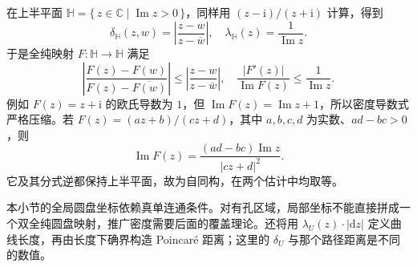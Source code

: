 \ProseParagraphBreak

在上半平面 \(\mathbb H=\{\,z\in\mathbb C\mid\operatorname{Im}z>0\,\}\)，同样用 \((z-\mathrm{i})/(z+\mathrm{i})\) 计算，得到
\[
 \delta_{\mathbb H}(z,w)=\left|\frac{z-w}{z-\overline w}\right|,
 \quad \lambda_{\mathbb H}(z)=\frac1{\operatorname{Im}z}.
\]
于是全纯映射 \(F:\mathbb H\rightarrow\mathbb H\) 满足
\[
 \left|\frac{F(z)-F(w)}{F(z)-\overline{F(w)}}\right|
 \le\left|\frac{z-w}{z-\overline w}\right|,
 \quad \frac{|F'(z)|}{\operatorname{Im}F(z)}\le\frac1{\operatorname{Im}z}.
\]
例如 \(F(z)=z+\mathrm{i}\) 的欧氏导数为 \(1\)，但 \(\operatorname{Im}F(z)=\operatorname{Im}z+1\)，所以密度导数式严格压缩。若 \(F(z)=(az+b)/(cz+d)\)，其中 \(a,b,c,d\) 为实数、\(ad-bc>0\)，则
\[
 \operatorname{Im}F(z)=\frac{(ad-bc)\operatorname{Im}z}{|cz+d|^2}.
\]
它及其分式逆都保持上半平面，故为自同构，在两个估计中均取等。

\ProseParagraphBreak

本小节的全局圆盘坐标依赖真单连通条件。对有孔区域，局部坐标不能直接拼成一个双全纯圆盘映射，推广密度需要后面的覆盖理论。还将用 \(\lambda_U(z)\cdot|\mathrm{d}z|\) 定义曲线长度，再由长度下确界构造 Poincaré 距离；这里的 \(\delta_U\) 与那个路径距离是不同的数值。
